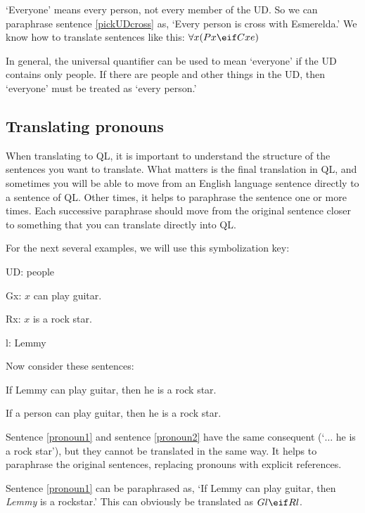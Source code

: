 `Everyone' means every person, not every member of the UD. So we can paraphrase sentence \ref{pickUDcross} as, `Every person is cross with Esmerelda.' We know how to translate sentences like this: $\forall x(Px \eif Cxe)$

In general, the universal quantifier can be used to mean `everyone' if the UD contains only people. If there are people and other things in the UD, then `everyone' must be treated as `every person.'





\subsection{Translating pronouns}
When translating to QL, it is important to understand the structure of the sentences you want to translate. What matters is the final translation in QL, and sometimes you will be able to move from an English language sentence directly to a sentence of QL. Other times, it helps to paraphrase the sentence one or more times. Each successive paraphrase should move from the original sentence closer to something that you can translate directly into QL.

For the next several examples, we will use this symbolization key:

\begin{ekey}
\item[UD:] people
\item[Gx:] $x$ can play guitar.
\item[Rx:] $x$ is a rock star.
\item[l:] Lemmy
\end{ekey}

Now consider these sentences:

\begin{earg}
\item[\ex{pronoun1}] If Lemmy can play guitar, then he is a rock star.
\item[\ex{pronoun2}] If a person can play guitar, then he is a rock star.
\end{earg}

Sentence \ref{pronoun1} and sentence \ref{pronoun2} have the same consequent (`$\ldots$ he is a rock star'), but they cannot be translated in the same way. It helps to paraphrase the original sentences, replacing pronouns with explicit references.

Sentence \ref{pronoun1} can be paraphrased as, `If Lemmy can play guitar, then \emph{Lemmy} is a rockstar.' This can obviously be translated as $Gl \eif Rl$.

